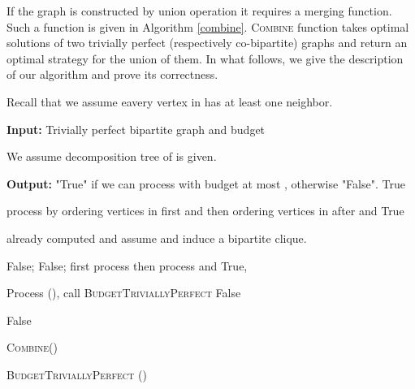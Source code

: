 \documentclass[letterpaper,11pt,abstracton]{scrartcl}
\begin{document}
If the graph is constructed by union operation it requires a merging function. Such a function is given
in Algorithm \ref{combine}. \textsc{Combine} function takes optimal solutions of two trivially perfect (respectively co-bipartite)
graphs and return an optimal strategy for the union of them. In what follows, we give the  description of our algorithm and prove its correctness.

Recall that we assume eavery vertex in  has at least one neighbor. 







\begin{algorithm}[H]
\begin{algorithmic}[1]
\State \textbf{Input:} Trivially perfect bipartite graph  and budget \;

\Comment We assume decomposition tree  of  is given.

\State \textbf{Output:} "True" if we can process  with budget at most , otherwise "False".\;
 \Return True\;
\EndIf

process  by ordering vertices in  first and then ordering vertices in  after and \Return True\;
\EndIf
{}\label{if-join}

\Comment  already computed and assume  and  induce a bipartite clique.

\If { } \Return False;
\ElsIf {} \Return False;
\Else {}  first process  then process  and \Return True,
\EndIf
\EndIf \label{if-join-end}


  \State Process (),
     \State \Return call \textsc{BudgetTriviallyPerfect}
     \;
\EndIf {}
\Return False\;
\EndIf \label{lastIF}







  \Return False\;



 \Else {} \Return \textsc{Combine}()
 \EndIf

\EndIf

\end{algorithmic}
\caption{{\textsc{BudgetTriviallyPerfect}} ()}
\label{alg:trivially-perfect}
\end{algorithm}
\end{document}

